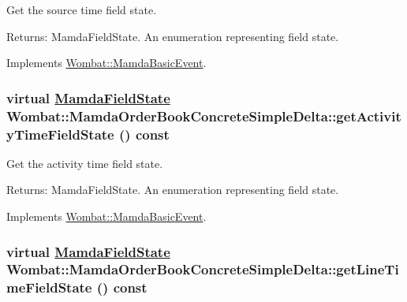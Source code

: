 Get the source time field state. 

\begin{Desc}
\item[Returns:]Mamda\-Field\-State. An enumeration representing field state. \end{Desc}


Implements \hyperlink{classWombat_1_1MamdaBasicEvent_9cd58f3d7b5ebea42fa86e5dde46ab18}{Wombat::Mamda\-Basic\-Event}.\hypertarget{classWombat_1_1MamdaOrderBookConcreteSimpleDelta_7860a6d80ad23193276b19faef6db47f}{
\subsubsection[getActivityTimeFieldState]{\setlength{\rightskip}{0pt plus 5cm}virtual \hyperlink{namespaceWombat_93aac974f2ab713554fd12a1fa3b7d2a}{Mamda\-Field\-State} Wombat::Mamda\-Order\-Book\-Concrete\-Simple\-Delta::get\-Activity\-Time\-Field\-State () const}}
\label{classWombat_1_1MamdaOrderBookConcreteSimpleDelta_7860a6d80ad23193276b19faef6db47f}


Get the activity time field state. 

\begin{Desc}
\item[Returns:]Mamda\-Field\-State. An enumeration representing field state. \end{Desc}


Implements \hyperlink{classWombat_1_1MamdaBasicEvent_a61a566e3442181ca1fadc4524296cd0}{Wombat::Mamda\-Basic\-Event}.\hypertarget{classWombat_1_1MamdaOrderBookConcreteSimpleDelta_bee5379fb48632af52473efa00f8e92b}{
\subsubsection[getLineTimeFieldState]{\setlength{\rightskip}{0pt plus 5cm}virtual \hyperlink{namespaceWombat_93aac974f2ab713554fd12a1fa3b7d2a}{Mamda\-Field\-State} Wombat::Mamda\-Order\-Book\-Concrete\-Simple\-Delta::get\-Line\-Time\-Field\-State () const}}
\label{classWombat_1_1MamdaOrderBookConcreteSimpleDelta_bee5379fb48632af52473efa00f8e92b}


